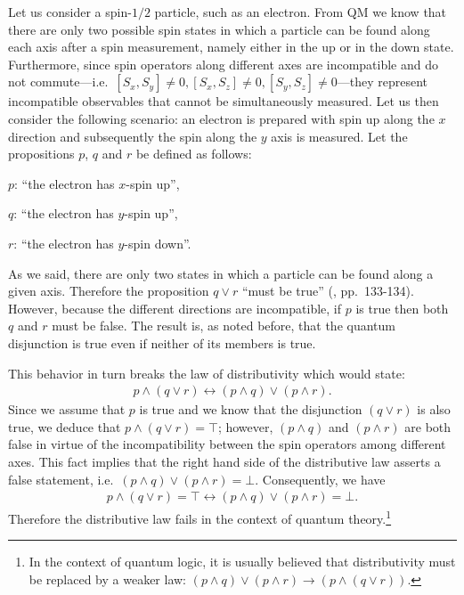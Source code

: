 \documentclass[11pt, executivepaper]{article}
\begin{document}
Let us consider a spin-$1/2$ particle, such as an electron. From QM we know that there are only two possible spin states in which a particle can be found along each axis after a spin measurement, namely either in the up or in the down state. Furthermore, since spin operators along different axes are incompatible and do not commute---i.e.\ $[S_x, S_y]\neq 0, [S_x, S_z]\neq 0, [S_y, S_z]\neq0$---they represent incompatible observables that cannot be simultaneously measured. Let us then consider the following scenario: an electron is prepared with spin up along the $x$ direction and subsequently the spin along the $y$ axis is measured. Let the propositions $p$, $q$ and $r$ be defined as follows:
\begin{description}
	\item $p$: ``the electron has $x$-spin up'', 
	\item $q$: ``the electron has $y$-spin up'',
	\item $r$: ``the electron has $y$-spin down''.
\end{description}
As we said, there are only two states in which a particle can be found along a given axis. Therefore the proposition $q \vee r$ ``must be true'' (\cite{Giuntini:2002}, pp.\ 133-134). However, because the different directions are incompatible, if $p$ is true then both $q$ and $r$ must be false. The result is, as noted before, that the quantum disjunction is true even if neither of its members is true.

This behavior in turn breaks the law of distributivity which would state:
\begin{align}
	\label{DL}
	p\wedge(q\vee r)\longleftrightarrow(p\wedge q)\vee(p\wedge r).
\end{align}
\noindent Since we assume that $p$ is true and we know that the disjunction $(q\vee r)$ is also true, we deduce that $p\wedge(q\vee r)=\top$; however, $(p\wedge q)$ and $(p\wedge r)$ are both false in virtue of the incompatibility between the spin operators among different axes. This fact implies that the right hand side of the distributive law asserts a false statement, i.e.\ $(p\wedge q)\vee(p\wedge r)=\bot$. Consequently, we have 
\begin{align}
	\label{contradiction}
	p\wedge(q\vee r)=\top\longleftrightarrow(p\wedge q)\vee(p\wedge r)=\bot. 
\end{align}
Therefore the distributive law fails in the context of quantum theory.\footnote{In the context of quantum logic, it is usually believed that distributivity must be replaced by a weaker law: $(p\wedge q)\vee(p\wedge r)\longrightarrow(p\wedge(q\vee r)).$}
\end{document}
